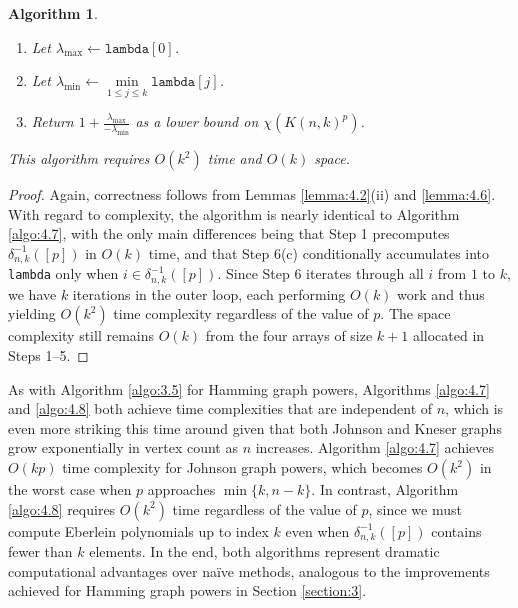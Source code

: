 \documentclass{article}
\numberwithin{equation}{section}
\theoremstyle{plain}
\newtheorem{algo}[theorem]{Algorithm}
\begin{document}
\begin{algo}
{\begin{enumerate}
\begin{enumerate}
\begin{enumerate}
                            \item Copy the values in \texttt{temp} into \texttt{eberCurr}.
                        \end{enumerate}
                    \item If $i \in S$:
                        \begin{enumerate}
                            \item For each $j = 0, 1, \ldots, k$:\\
                                \hspace*{\algorithmicindent}Set $\texttt{lambda}[j] \gets \texttt{lambda}[j] + \texttt{eberCurr}[j]$.
                        \end{enumerate}
                \end{enumerate}
            \item Let $\lambda_{\text{max}} \gets \texttt{lambda}[0]$.
            \item Let $\lambda_{\text{min}} \gets \min\limits_{1 \le j \le k} \texttt{lambda}[j]$.
            \item Return $1 + \frac{\lambda_{\text{max}}}{-\lambda_{\text{min}}}$ as a lower bound on $\chi(K(n, k)^p)$.
        \end{enumerate}
    }
    This algorithm requires $O(k^2)$ time and $O(k)$ space.
\end{algo}

\begin{proof}
    Again, correctness follows from Lemmas \ref{lemma:4.2}(ii) and \ref{lemma:4.6}. With regard to complexity, the algorithm is nearly identical to Algorithm \ref{algo:4.7}, with the only main differences being that Step 1 precomputes $\delta_{n,k}^{-1}([p])$ in $O(k)$ time, and that Step 6(c) conditionally accumulates into \texttt{lambda} only when $i \in \delta_{n,k}^{-1}([p])$. Since Step 6 iterates through all $i$ from $1$ to $k$, we have $k$ iterations in the outer loop, each performing $O(k)$ work and thus yielding $O(k^2)$ time complexity regardless of the value of $p$. The space complexity still remains $O(k)$ from the four arrays of size $k + 1$ allocated in Steps 1--5.
\end{proof}

As with Algorithm \ref{algo:3.5} for Hamming graph powers, Algorithms \ref{algo:4.7} and \ref{algo:4.8} both achieve time complexities that are independent of $n$, which is even more striking this time around given that both Johnson and Kneser graphs grow exponentially in vertex count as $n$ increases. Algorithm \ref{algo:4.7} achieves $O(kp)$ time complexity for Johnson graph powers, which becomes $O(k^2)$ in the worst case when $p$ approaches $\min\{k, n - k\}$. In contrast, Algorithm \ref{algo:4.8} requires $O(k^2)$ time regardless of the value of $p$, since we must compute Eberlein polynomials up to index $k$ even when $\delta_{n,k}^{-1}([p])$ contains fewer than $k$ elements. In the end, both algorithms represent dramatic computational advantages over na\"ive methods, analogous to the improvements achieved for Hamming graph powers in Section \ref{section:3}.
\end{document}
